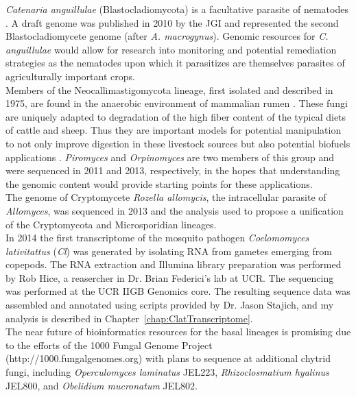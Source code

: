 \indent \textit{Catenaria anguillulae} (Blastocladiomycota) is a facultative parasite of nematodes \cite{Deacon1997}. A draft genome was published in 2010 by the JGI and represented the second Blastocladiomycete genome (after \textit{A. macrogynus}). Genomic resources for \textit{C. anguillulae} would allow for research into monitoring and potential remediation strategies as the nematodes upon which it parasitizes are themselves parasites of agriculturally important crops.\\
\indent Members of the Neocallimastigomycota lineage, first isolated and described in 1975, are found in the anaerobic environment of mammalian rumen \cite{Orpin1975}. These fungi are uniquely adapted to degradation of the high fiber content of the typical diets of cattle and sheep. Thus they are important models for potential manipulation to not only improve digestion in these livestock sources \cite{Ho1995} but also potential biofuels applications \cite{Youssef2013}. \textit{Piromyces} and \textit{Orpinomyces} are two members of this group and were sequenced in 2011 and 2013, respectively, in the hopes that understanding the genomic content would provide starting points for these applications. \\
\indent The genome of Cryptomycete \textit{Rozella allomycis}, the intracellular parasite of \textit{Allomyces}, was sequenced in 2013 \cite{James2013} and the analysis used to propose a unification of the Cryptomycota and Microsporidian lineages.\\
\indent In 2014 the first transcriptome of the mosquito pathogen \textit{Coelomomyces lativitattus} (\textit{Cl}) was generated by isolating RNA from gametes emerging from copepods. The RNA extraction and Illumina library preparation was performed by Rob Hice, a reasercher in Dr. Brian Federici's lab at UCR. The sequencing was performed at the UCR IIGB Genomics core. The resulting sequence data was assembled and annotated using scripts provided by Dr. Jason Stajich, and my analysis is described in Chapter~\ref{chap:ClatTranscriptome}.\\
\indent The near future of bioinformatics resources for the basal lineages is promising due to the efforts of the 1000 Fungal Genome Project (http://1000.fungalgenomes.org) with plans to sequence at additional chytrid fungi, including \textit{Operculomyces laminatus} JEL223, \textit{Rhizoclosmatium hyalinus} JEL800, and \textit{Obelidium mucronatum} JEL802. \\
